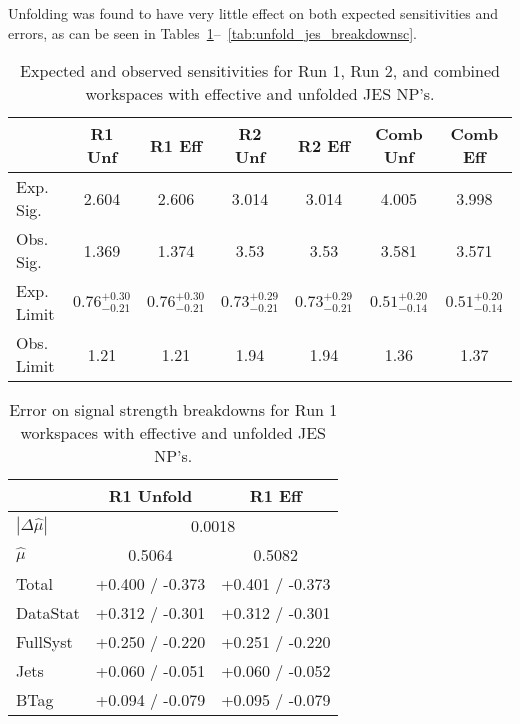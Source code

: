 Unfolding was found to have very little effect on both expected sensitivities and errors, as can be seen in Tables~\ref{tab:unfold_jes_sensitivities}--~\ref{tab:unfold_jes_breakdownsc}.
\begin{table}[!htbp]\captionsetup{justification=centering}
\begin{center}\begin{tabular}{lcccccc}
\hline\hline
 & R1 Unf & R1 Eff & R2 Unf & R2 Eff & Comb Unf & Comb Eff\\
\hline
Exp. Sig. &  2.604 & 2.606 & 3.014 & 3.014 & 4.005 & 3.998\\
Obs. Sig. & 1.369 & 1.374 & 3.53 & 3.53 & 3.581 & 3.571\\
\hline
Exp. Limit &  $0.76^{+0.30}_{-0.21}$ & $0.76^{+0.30}_{-0.21}$ & $0.73^{+0.29}_{-0.21}$ & $0.73^{+0.29}_{-0.21}$ & $0.51^{+0.20}_{-0.14}$ & $0.51^{+0.20}_{-0.14}$\\
Obs. Limit & 1.21 & 1.21 & 1.94 & 1.94 & 1.36 & 1.37\\
\hline\hline
\end{tabular}
\caption{Expected and observed sensitivities for Run 1, Run 2, and combined workspaces with effective and unfolded JES NP's.}
\label{tab:unfold_jes_sensitivities}
\end{center}
\end{table}

\begin{table}[!htbp]\captionsetup{justification=centering}
\begin{center}\begin{tabular}{lcc}
\hline\hline
 & R1 Unfold & R1 Eff \\
\hline
$\left|\Delta\hat{\mu}\right|$ &  \multicolumn{2}{c}{0.0018} \\
$\hat{\mu}$ & 0.5064 & 0.5082 \\
\hline
Total &  +0.400 / -0.373  &  +0.401 / -0.373  \\
DataStat &  +0.312 / -0.301  &  +0.312 / -0.301\\
FullSyst &  +0.250 / -0.220  &  +0.251 / -0.220\\
\hline
Jets &  +0.060 / -0.051  &  +0.060 / -0.052  \\
BTag &  +0.094 / -0.079  &  +0.095 / -0.079  \\
\hline
\hline
\end{tabular}
\caption{Error on signal strength breakdowns for  Run 1 workspaces with effective and unfolded JES NP's.}
\label{tab:unfold_jes_breakdowns1}
\end{center}
\end{table}


